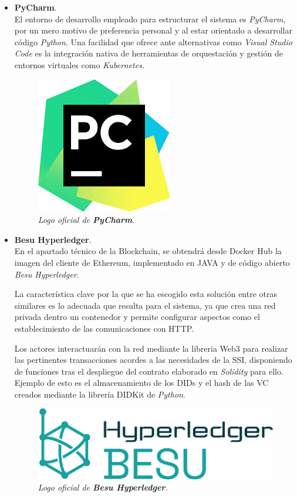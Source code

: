 \documentclass[../main.tex]{subfiles}
\begin{document}
\begin{itemize}
    \newpage
    \item \textbf{PyCharm}. \\ 
    El \Gls{entorno de desarrollo} empleado para estructurar el sistema es \textit{PyCharm}, por un mero motivo de preferencia personal y al estar orientado a desarrollar código \textit{Python}. Una facilidad que ofrece ante alternativas como \textit{Visual Studio Code} es la integración nativa de herramientas de orquestación y gestión de entornos virtuales como \textit{Kubernetes}.
    \\
    
    \begin{figure}[htbp]
        \centering
        \includegraphics[width=0.25\linewidth]{images/technologies/pycharm.jpg}
        \caption{\textit{Logo oficial de \textbf{PyCharm}.}}
    \end{figure}
    
    \item \textbf{Besu Hyperledger}. \\ 
    En el apartado técnico de la Blockchain, se obtendrá desde Docker Hub la imagen del cliente de Ethereum, implementado en JAVA y de código abierto \textit{Besu Hyperledger}. 
    
    La característica clave por la que se ha escogido esta solución entre otras similares es lo adecuada que resulta para el sistema, ya que crea una red privada dentro un contenedor y permite configurar aspectos como el establecimiento de las comunicaciones con HTTP.

    Los actores interactuarán con la red mediante la libreria Web3 para realizar las pertinentes transacciones acordes a las necesidades de la \acrshort{SSI}, disponiendo de funciones tras el despliegue del contrato elaborado en \textit{Solidity} para ello. Ejemplo de esto es el almacenamiento de los \acrshort{DID}s y el \Gls{hash} de las \acrshort{VC} creados mediante la librería DIDKit de \textit{Python}.
    \\ 

    \begin{figure}[htbp]
        \centering
        \includegraphics[width=0.5\linewidth]{images/technologies/besu.png}
        \caption{\textit{Logo oficial de \textbf{Besu Hyperledger}.}}
    \end{figure}

\end{itemize}
\end{document}
